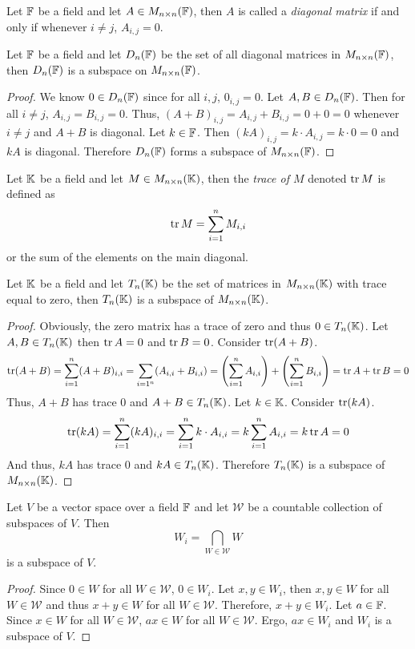 \begin{definition}
	Let $\mathbb{F}$ be a field and let $A\in M_{n\times n}(\mathbb{F})$, then $A$ is called a \textit{diagonal matrix} if and only if whenever $i\neq j$, $A_{i,j}=0$.
\end{definition}

\begin{example}
	Let $\mathbb{F}$ be a field and let $D_n(\mathbb{F})$ be the set of all diagonal matrices in $M_{n\times n}(\mathbb{F})$, then $D_n(\mathbb{F})$ is a subspace on $M_{n\times n}(\mathbb{F})$.
\end{example}
\begin{proof}
	We know $0\in D_n(\mathbb{F})$ since for all $i,j$, $0_{i,j}=0$.
	Let $A,B\in D_n(\mathbb{F})$.
	Then for all $i\neq j$, $A_{i,j}=B_{i,j}=0$.
	Thus, $(A+B)_{i,j}=A_{i,j}+B_{i,j}=0+0=0$ whenever $i\neq j$ and $A+B$ is diagonal.
	Let $k\in\mathbb{F}$.
	Then $(kA)_{i,j}=k\cdot A_{i,j}=k\cdot 0=0$ and $kA$ is diagonal.
	Therefore $D_n(\mathbb{F})$ forms a subspace of $M_{n\times n}(\mathbb{F})$.
\end{proof}

\begin{definition}
	Let $\mathbb{K}$ be a field and let $M\in M_{n\times n}(\mathbb{K})$, then the \textit{trace of $M$} denoted $\operatorname{tr} M$ is defined as
	\[
		\operatorname{tr} M = \sum_{i=1}^n M_{i,i}
	\]
	or the sum of the elements on the main diagonal.
\end{definition}

\begin{example}
	Let $\mathbb{K}$ be a field and let $T_n(\mathbb{K})$ be the set of matrices in $M_{n\times n}(\mathbb{K})$ with trace equal to zero, then $T_n(\mathbb{K})$ is a subspace of $M_{n\times n}(\mathbb{K})$.
\end{example}
\begin{proof}
	Obviously, the zero matrix has a trace of zero and thus $0\in T_n(\mathbb{K})$.
	Let $A,B\in T_n(\mathbb{K})$ then $\operatorname{tr} A = 0$ and $\operatorname{tr} B = 0$.
	Consider $\operatorname{tr} (A+B)$.
	\[
		\operatorname{tr} (A+B)
		= \sum_{i=1}^n (A+B)_{i,i}
		= \sum_{i=1^n} (A_{i,i}+B_{i,i})
		= \left( \sum_{i=1}^n A_{i,i} \right) + \left( \sum_{i=1}^n B_{i,i} \right)
		= \operatorname{tr} A + \operatorname{tr} B
		= 0
	\]
	Thus, $A+B$ has trace 0 and $A+B\in T_n(\mathbb{K})$.
	Let $k\in\mathbb{K}$.
	Consider $\operatorname{tr} (kA)$.
	\[
		\operatorname{tr} (kA)
		= \sum_{i=1}^n (kA)_{i,i}
		= \sum_{i=1}^n k\cdot A_{i,i}
		= k\sum_{i=1}^n A_{i,i}
		= k\operatorname{tr} A
		= 0
	\]
	And thus, $kA$ has trace 0 and $kA\in T_n(\mathbb{K})$.
	Therefore $T_n(\mathbb{K})$ is a subspace of $M_{n\times n}(\mathbb{K})$.
\end{proof}

\begin{thm}
	Let $V$ be a vector space over a field $\mathbb{F}$ and let $\mathcal{W}$ be a countable collection of subspaces of $V$.
	Then
	\[
		W_i = \bigcap_{W\in\mathcal{W}} W
	\]
	is a subspace of $V$.
\end{thm}
\begin{proof}
	Since $0\in W$ for all $W\in\mathcal{W}$, $0\in W_i$.
	Let $x,y\in W_i$, then $x,y\in W$ for all $W\in\mathcal{W}$ and thus $x+y\in W$ for all $W\in\mathcal{W}$.
	Therefore, $x+y\in W_i$.
	Let $a\in\mathbb{F}$.
	Since $x\in W$ for all $W\in\mathcal{W}$, $ax\in W$ for all $W\in\mathcal{W}$.
	Ergo, $ax\in W_i$ and $W_i$ is a subspace of $V$.
\end{proof}

